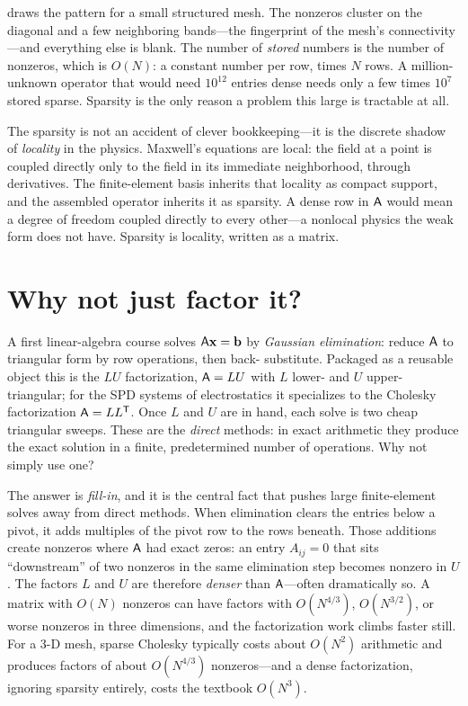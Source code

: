  draws the pattern for a small structured mesh. The
nonzeros cluster on the diagonal and a few neighboring bands---the fingerprint of
the mesh's connectivity---and everything else is blank. The number of \emph{stored}
numbers is the number of nonzeros, which is $O(N)$: a constant number per row,
times $N$ rows. A million-unknown operator that would need $10^{12}$ entries dense
needs only a few times $10^7$ stored sparse. Sparsity is the only reason a problem
this large is tractable at all.

\begin{physicsbox}
The sparsity is not an accident of clever bookkeeping---it is the discrete shadow
of \emph{locality} in the physics. Maxwell's equations are local: the field at a
point is coupled directly only to the field in its immediate neighborhood, through
derivatives. The finite-element basis inherits that locality as compact support,
and the assembled operator inherits it as sparsity. A dense row in $\mathsf{A}$ would
mean a degree of freedom coupled directly to every other---a nonlocal physics the
weak form does not have. Sparsity is locality, written as a matrix.
\end{physicsbox}

\section{Why not just factor it?}
\label{sec:krylov-direct}

A first linear-algebra course solves $\mathsf{A}\mathbf{x}=\mathbf{b}$ by \emph{Gaussian
elimination}: reduce $\mathsf{A}$ to triangular form by row operations, then back-
substitute. Packaged as a reusable object this is the $LU$ factorization,
$\mathsf{A}=LU$ with $L$ lower- and $U$ upper-triangular; for the SPD systems of
electrostatics it specializes to the Cholesky factorization $\mathsf{A}=LL^{\mathsf
T}$. Once $L$ and $U$ are in hand, each solve is two cheap triangular sweeps. These
are the \emph{direct} methods: in exact arithmetic they produce the exact solution
in a finite, predetermined number of operations. Why not simply use one?

The answer is \emph{fill-in}, and it is the central fact that pushes large
finite-element solves away from direct methods. When elimination clears the entries
below a pivot, it adds multiples of the pivot row to the rows beneath. Those
additions create nonzeros where $\mathsf{A}$ had exact zeros: an entry $A_{ij}=0$ that
sits ``downstream'' of two nonzeros in the same elimination step becomes nonzero in
$U$. The factors $L$ and $U$ are therefore \emph{denser} than $\mathsf{A}$---often
dramatically so. A matrix with $O(N)$ nonzeros can have factors with
$O(N^{4/3})$, $O(N^{3/2})$, or worse nonzeros in three dimensions, and the
factorization work climbs faster still. For a 3-D mesh, sparse Cholesky typically
costs about $O(N^2)$ arithmetic and produces factors of about $O(N^{4/3})$
nonzeros---and a dense factorization, ignoring sparsity entirely, costs the
textbook $O(N^3)$.

